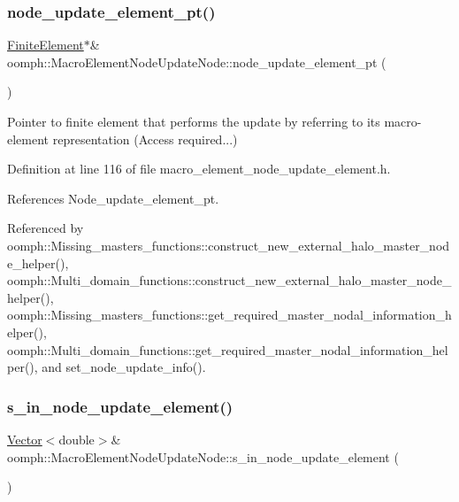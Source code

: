 \subsubsection{\texorpdfstring{node\+\_\+update\+\_\+element\+\_\+pt()}{node\_update\_element\_pt()}}
{\footnotesize\ttfamily \hyperlink{classoomph_1_1FiniteElement}{Finite\+Element}$\ast$\& oomph\+::\+Macro\+Element\+Node\+Update\+Node\+::node\+\_\+update\+\_\+element\+\_\+pt (\begin{DoxyParamCaption}{ }\end{DoxyParamCaption})\hspace{0.3cm}{\ttfamily [inline]}}



Pointer to finite element that performs the update by referring to its macro-\/element representation (Access required...) 



Definition at line 116 of file macro\+\_\+element\+\_\+node\+\_\+update\+\_\+element.\+h.



References Node\+\_\+update\+\_\+element\+\_\+pt.



Referenced by oomph\+::\+Missing\+\_\+masters\+\_\+functions\+::construct\+\_\+new\+\_\+external\+\_\+halo\+\_\+master\+\_\+node\+\_\+helper(), oomph\+::\+Multi\+\_\+domain\+\_\+functions\+::construct\+\_\+new\+\_\+external\+\_\+halo\+\_\+master\+\_\+node\+\_\+helper(), oomph\+::\+Missing\+\_\+masters\+\_\+functions\+::get\+\_\+required\+\_\+master\+\_\+nodal\+\_\+information\+\_\+helper(), oomph\+::\+Multi\+\_\+domain\+\_\+functions\+::get\+\_\+required\+\_\+master\+\_\+nodal\+\_\+information\+\_\+helper(), and set\+\_\+node\+\_\+update\+\_\+info().

\mbox{\label{classoomph_1_1MacroElementNodeUpdateNode_a257cc8ea07e10ba7e21a04613bd37a39}} 
\subsubsection{\texorpdfstring{s\+\_\+in\+\_\+node\+\_\+update\+\_\+element()}{s\_in\_node\_update\_element()}}
{\footnotesize\ttfamily \hyperlink{classoomph_1_1Vector}{Vector}$<$double$>$\& oomph\+::\+Macro\+Element\+Node\+Update\+Node\+::s\+\_\+in\+\_\+node\+\_\+update\+\_\+element (\begin{DoxyParamCaption}{ }\end{DoxyParamCaption})\hspace{0.3cm}{\ttfamily [inline]}}



